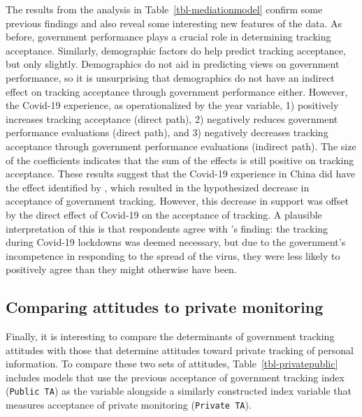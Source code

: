 \documentclass[
  number]{elsarticle}
\begin{document}
The results from the analysis in Table~\ref{tbl-mediationmodel} confirm
some previous findings and also reveal some interesting new features of
the data. As before, government performance plays a crucial role in
determining tracking acceptance. Similarly, demographic factors do help
predict tracking acceptance, but only slightly. Demographics do not aid
in predicting views on government performance, so it is unsurprising
that demographics do not have an indirect effect on tracking acceptance
through government performance either. However, the Covid-19 experience,
as operationalized by the year variable, 1) positively increases
tracking acceptance (direct path), 2) negatively reduces government
performance evaluations (direct path), and 3) negatively decreases
tracking acceptance through government performance evaluations (indirect
path). The size of the coefficients indicates that the sum of the
effects is still positive on tracking acceptance. These results suggest
that the Covid-19 experience in China did have the effect identified by
\citep{you2024}, which resulted in the hypothesized decrease in
acceptance of government tracking. However, this decrease in support was
offset by the direct effect of Covid-19 on the acceptance of tracking. A
plausible interpretation of this is that respondents agree with
\citep{kostka2024}'s finding: the tracking during Covid-19 lockdowns was
deemed necessary, but due to the government's incompetence in responding
to the spread of the virus, they were less likely to positively agree
than they might otherwise have been.

\subsection{Comparing attitudes to private
monitoring}\label{comparing-attitudes-to-private-monitoring}

Finally, it is interesting to compare the determinants of government
tracking attitudes with those that determine attitudes toward private
tracking of personal information. To compare these two sets of
attitudes, Table~\ref{tbl-privatepublic} includes models that use the
previous acceptance of government tracking index (\texttt{Public\ TA})
as the variable alongside a similarly constructed index variable that
measures acceptance of private monitoring (\texttt{Private\ TA}).
\end{document}
